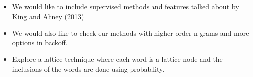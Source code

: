 \documentclass[a0paper,fontscale=0.3]{baposter}  %
\begin{document}
\begin{poster}
{\begin{itemize}
			\item	We would like to include supervised methods and features talked about by King and Abney (2013)
		\newline	

			\item	We would also like to check our methods with higher order n-grams and more options in backoff.
		\newline	

			\item	Explore a lattice technique where each word is a lattice node and the inclusions of the words are done using probability.
		\newline	
			\end{itemize}
		\vspace{-0.12cm}
		}

\end{poster}
\end{document}
